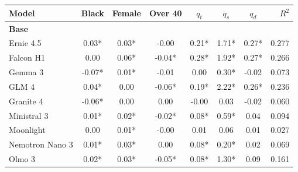 \begin{table}[p]
\centering
\scriptsize
\setlength{\tabcolsep}{5pt}
\renewcommand{\arraystretch}{1.18}
\begin{tabular}{lccccccr}
\toprule
Model & Black & Female & Over 40 & $q_t$ & $q_s$ & $q_d$ & $R^2$ \\
\midrule
\multicolumn{8}{l}{\textbf{Base}} \\
Ernie 4.5 & \cellcolor[HTML]{A9E4C5}0.03* & \cellcolor[HTML]{BEEBD4}0.03* & \cellcolor[HTML]{FEFBFA}-0.00 & \cellcolor[HTML]{A8E4C5}0.21* & \cellcolor[HTML]{92DDB6}1.71* & \cellcolor[HTML]{87DAAE}0.27* & 0.277 \\
Falcon H1 & \cellcolor[HTML]{F6FCF9}0.00 & \cellcolor[HTML]{89DAB0}0.06* & \cellcolor[HTML]{F8CDC8}-0.04* & \cellcolor[HTML]{8BDBB1}0.28* & \cellcolor[HTML]{85D9AD}1.92* & \cellcolor[HTML]{87DAAF}0.27* & 0.266 \\
Gemma 3 & \cellcolor[HTML]{E74C3C}-0.07* & \cellcolor[HTML]{E5F7EE}0.01* & \cellcolor[HTML]{FEF7F6}-0.01 & \cellcolor[HTML]{FDFEFE}0.00 & \cellcolor[HTML]{ECF9F2}0.30* & \cellcolor[HTML]{FEF6F5}-0.02 & 0.073 \\
GLM 4 & \cellcolor[HTML]{90DCB4}0.04* & \cellcolor[HTML]{FDFEFD}0.00 & \cellcolor[HTML]{F3A8A0}-0.06* & \cellcolor[HTML]{AEE6C8}0.19* & \cellcolor[HTML]{72D3A0}2.22* & \cellcolor[HTML]{8BDBB2}0.26* & 0.236 \\
Granite 4 & \cellcolor[HTML]{E95C4E}-0.06* & \cellcolor[HTML]{F6FCF9}0.00 & \cellcolor[HTML]{FFFFFF}0.00 & \cellcolor[HTML]{FFFEFE}-0.00 & \cellcolor[HTML]{FDFEFE}0.03 & \cellcolor[HTML]{FEF8F8}-0.02 & 0.060 \\
Ministral 3 & \cellcolor[HTML]{D4F2E3}0.01* & \cellcolor[HTML]{DAF4E7}0.02* & \cellcolor[HTML]{FBE0DE}-0.02* & \cellcolor[HTML]{DEF5E9}0.08* & \cellcolor[HTML]{D9F3E6}0.59* & \cellcolor[HTML]{EEFAF3}0.04 & 0.094 \\
Moonlight & \cellcolor[HTML]{FFFFFF}0.00 & \cellcolor[HTML]{E5F7EE}0.01* & \cellcolor[HTML]{FEFAFA}-0.00 & \cellcolor[HTML]{FCFEFD}0.01 & \cellcolor[HTML]{FBFEFC}0.06 & \cellcolor[HTML]{FCFEFD}0.01 & 0.027 \\
Nemotron Nano 3 & \cellcolor[HTML]{DBF4E7}0.01* & \cellcolor[HTML]{B8E9D0}0.03* & \cellcolor[HTML]{FDFEFE}0.00 & \cellcolor[HTML]{DFF5EA}0.08* & \cellcolor[HTML]{F2FBF7}0.20* & \cellcolor[HTML]{F6FCF9}0.02 & 0.069 \\
Olmo 3 & \cellcolor[HTML]{C5EDD8}0.02* & \cellcolor[HTML]{C8EEDA}0.03* & \cellcolor[HTML]{F5B7B1}-0.05* & \cellcolor[HTML]{DCF4E8}0.08* & \cellcolor[HTML]{ACE5C8}1.30* & \cellcolor[HTML]{D9F3E5}0.09 & 0.161 \\

\end{tabular}
\end{table}

